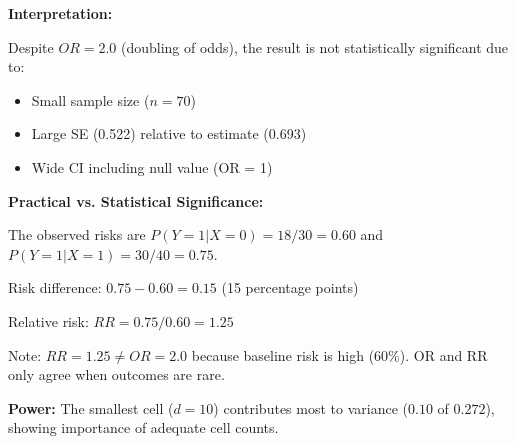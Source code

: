 \begin{explanation}
\textbf{Interpretation:}

Despite $OR = 2.0$ (doubling of odds), the result is not statistically significant due to:
\begin{itemize}
\item Small sample size ($n=70$)
\item Large SE (0.522) relative to estimate (0.693)
\item Wide CI including null value (OR = 1)
\end{itemize}

\textbf{Practical vs. Statistical Significance:}

The observed risks are $P(Y=1|X=0) = 18/30 = 0.60$ and $P(Y=1|X=1) = 30/40 = 0.75$.

Risk difference: $0.75 - 0.60 = 0.15$ (15 percentage points)

Relative risk: $RR = 0.75/0.60 = 1.25$

Note: $RR = 1.25 \neq OR = 2.0$ because baseline risk is high (60\%). OR and RR only agree when outcomes are rare.

\textbf{Power:} The smallest cell ($d=10$) contributes most to variance ($0.10$ of $0.272$), showing importance of adequate cell counts.
\end{explanation}

\newpage
